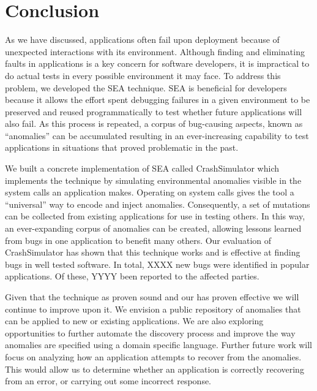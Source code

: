 \section{Conclusion}
\label{SEC:conclusion}

As we have discussed,
applications often fail upon deployment because of unexpected interactions
with its environment.
Although finding and eliminating
faults in applications is a key concern for software developers, it is
impractical to do actual tests in every possible
environment it may face.
To address this problem, we developed the SEA
technique.
SEA is beneficial for developers because it allows
the effort spent debugging failures in a given environment
to be preserved and reused programmatically to test whether
future applications will also fail.
As this process is repeated,
a corpus of bug-causing aspects,
known as ``anomalies'' can be accumulated
resulting in an ever-increasing capability
to test applications in situations
that proved problematic in the past.

We built a concrete implementation of SEA
called CrashSimulator which implements
the technique by simulating environmental
anomalies visible in the system calls an application makes.
Operating on system calls gives the tool a ``universal'' way to
encode and inject anomalies. Consequently, a set of mutations can be
collected from existing applications for use in testing others.
In this way, an ever-expanding corpus of anomalies can be
created, allowing lessons learned from bugs in one application to benefit
many others.
Our evaluation of CrashSimulator
has shown that this technique works and is
effective at finding bugs in well tested software.
In total,
XXXX new bugs were identified in popular applications.
Of these, YYYY been reported to the
affected parties.

Given that the technique as proven sound
and our has proven effective we will continue to improve upon it.
We envision a public repository of anomalies
that can be applied to new or existing applications.
We are also exploring
opportunities to further automate the discovery process
and improve the way anomalies are specified using a
domain specific language.
Further future work
will focus on analyzing how an
application attempts
to recover from the anomalies.  This would allow
us to determine whether
an application is correctly recovering
from an error, or carrying out some incorrect response.
